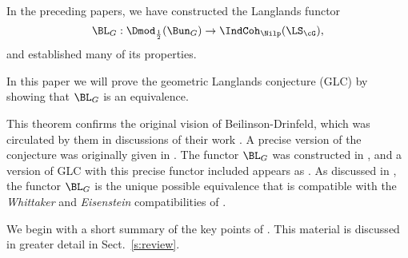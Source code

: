 \documentclass[9pt]{amsart}
\theoremstyle{remark}
\theoremstyle{definition}
\theoremstyle{remark}
\newcommand{\secref}[1]{Sect.~\ref{#1}}
\numberwithin{equation}{section}
\begin{document}
\medskip

In the preceding papers, we have constructed the Langlands functor 
\begin{equation} \label{e:LG Intro}
\BL_G:\Dmod_{\frac{1}{2}}(\Bun_G) \to \IndCoh_\Nilp(\LS_{\cG}),
\end{equation}
and established many of its properties.

\medskip

In this paper we will prove the 
geometric Langlands conjecture (GLC) by showing 
that $\BL_G$ is an equivalence. 

\medskip 

This theorem confirms the original vision of 
Beilinson-Drinfeld, which
was circulated by them in discussions of their work \cite{BD}. 
A precise version of the conjecture was originally
given in \cite[Conjecture 11.2.3]{AG}. The functor $\BL_G$
was constructed in \cite{GLC1}, and a version of GLC with
this precise functor included 
appears as \cite[Conjecture 1.6.7]{GLC1}. As discussed
in \cite{GLC1}, the functor
$\BL_G$ is the unique possible equivalence that is
compatible with the \emph{Whittaker} and \emph{Eisenstein}
compatibilities of \cite{Ga4}. 


%
%
% 

 \label{ss:lan party}

We begin with a short summary of the key points of \cite{GLC1,GLC2,GLC3,GLC4}.
This material is discussed in greater detail in \secref{s:review}.
\end{document}
